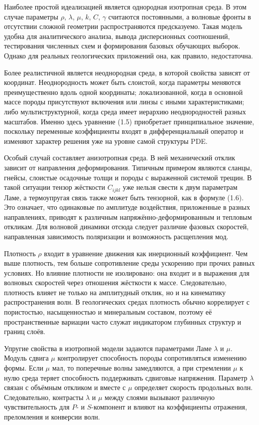 Наиболее простой идеализацией является однородная изотропная среда. В этом случае параметры $\rho$, $\lambda$, $\mu$, $k$, $C$, $\gamma$ считаются постоянными, а волновые фронты в отсутствии сложной геометрии распространяются предсказуемо. Такая модель удобна для аналитического анализа, вывода дисперсионных соотношений, тестирования численных схем и формирования базовых обучающих выборок. Однако для реальных геологических приложений она, как правило, недостаточна.

Более реалистичной является неоднородная среда, в которой свойства зависят от координат. Неоднородность может быть слоистой, когда параметры меняются преимущественно вдоль одной координаты; локализованной, когда в основной массе породы присутствуют включения или линзы с иными характеристиками; либо мультиструктурной, когда среда имеет иерархию неоднородностей разных масштабов. Именно здесь уравнение (1.5) приобретает принципиальное значение, поскольку переменные коэффициенты входят в дифференциальный оператор и изменяют характер решения уже на уровне самой структуры PDE.

Особый случай составляет анизотропная среда. В ней механический отклик зависит от направления деформирования. Типичным примером являются сланцы, гнейсы, слоистые осадочные толщи и породы с выраженной системой трещин. В такой ситуации тензор жёсткости $C_{ijkl}$ уже нельзя свести к двум параметрам Ламе, а термоупругая связь также может быть тензорной, как в формуле (1.6). Это означает, что одинаковые по амплитуде воздействия, приложенные в разных направлениях, приводят к различным напряжённо-деформированным и тепловым откликам. Для волновой динамики отсюда следует различие фазовых скоростей, направленная зависимость поляризации и возможность расщепления мод.

Плотность $\rho$ входит в уравнение движения как инерционный коэффициент. Чем выше плотность, тем больше сопротивление среды ускорению при прочих равных условиях. Но влияние плотности не изолировано: она входит и в выражения для волновых скоростей через отношения жёсткости к массе. Следовательно, плотность влияет не только на амплитудный отклик, но и на кинематику распространения волн. В геологических средах плотность обычно коррелирует с пористостью, насыщенностью и минеральным составом, поэтому её пространственные вариации часто служат индикатором глубинных структур и границ слоёв.

Упругие свойства в изотропной модели задаются параметрами Ламе $\lambda$ и $\mu$. Модуль сдвига $\mu$ контролирует способность породы сопротивляться изменению формы. Если $\mu$ мал, то поперечные волны замедляются, а при стремлении $\mu$ к нулю среда теряет способность поддерживать сдвиговые напряжения. Параметр $\lambda$ связан с объёмным откликом и вместе с $\mu$ определяет скорость продольных волн. Следовательно, контрасты $\lambda$ и $\mu$ между слоями вызывают различную чувствительность для $P$- и $S$-компонент и влияют на коэффициенты отражения, преломления и конверсии волн.

